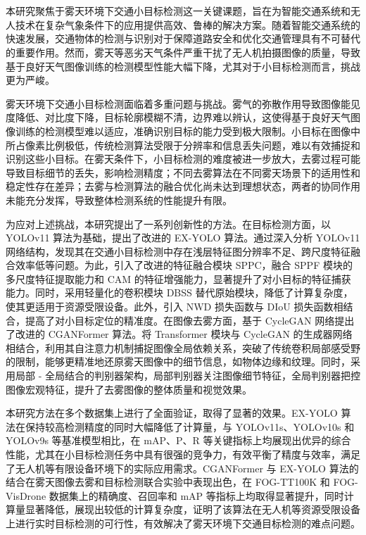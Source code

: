 \section*{\ArticleTitle}
\begin{cnabstract}
\fontsize{14pt}{17.5pt}\selectfont %

本研究聚焦于雾天环境下交通小目标检测这一关键课题，旨在为智能交通系统和无人技术在复杂气象条件下的应用提供高效、鲁棒的解决方案。随着智能交通系统的快速发展，交通物体的检测与识别对于保障道路安全和优化交通管理具有不可替代的重要作用。然而，雾天等恶劣天气条件严重干扰了无人机拍摄图像的质量，导致基于良好天气图像训练的检测模型性能大幅下降，尤其对于小目标检测而言，挑战更为严峻。

雾天环境下交通小目标检测面临着多重问题与挑战。雾气的弥散作用导致图像能见度降低、对比度下降，目标轮廓模糊不清，边界难以辨认，这使得基于良好天气图像训练的检测模型难以适应，准确识别目标的能力受到极大限制。小目标在图像中所占像素比例极低，传统检测算法受限于分辨率和信息丢失问题，难以有效捕捉和识别这些小目标。在雾天条件下，小目标检测的难度被进一步放大，去雾过程可能导致目标细节的丢失，影响检测精度；不同去雾算法在不同雾天场景下的适用性和稳定性存在差异；去雾与检测算法的融合优化尚未达到理想状态，两者的协同作用未能充分发挥，导致整体检测系统的性能提升有限。

为应对上述挑战，本研究提出了一系列创新性的方法。在目标检测方面，以 YOLOv11 算法为基础，提出了改进的 EX-YOLO 算法。通过深入分析 YOLOv11 网络结构，发现其在交通小目标检测中存在浅层特征图分辨率不足、跨尺度特征融合效率低等问题。为此，引入了改进的特征融合模块 SPPC，融合 SPPF 模块的多尺度特征提取能力和 CAM 的特征增强能力，显著提升了对小目标的特征捕获能力。同时，采用轻量化的卷积模块 DBSS 替代原始模块，降低了计算复杂度，使其更适用于资源受限设备。此外，引入 NWD 损失函数与 DIoU 损失函数相结合，提高了对小目标定位的精准度。在图像去雾方面，基于 CycleGAN 网络提出了改进的 CGANFormer 算法。将 Transformer 模块与 CycleGAN 的生成器网络相结合，利用其自注意力机制捕捉图像全局依赖关系，突破了传统卷积局部感受野的限制，能够更精准地还原雾天图像中的细节信息，如物体边缘和纹理。同时，采用局部 - 全局结合的判别器架构，局部判别器关注图像细节特征，全局判别器把控图像宏观特征，提升了去雾图像的整体质量和视觉效果。

本研究方法在多个数据集上进行了全面验证，取得了显著的效果。EX-YOLO 算法在保持较高检测精度的同时大幅降低了计算量，与 YOLOv11s、YOLOv10s 和 YOLOv9s 等基准模型相比，在 mAP、P、R 等关键指标上均展现出优异的综合性能，尤其在小目标检测任务中具有很强的竞争力，有效平衡了精度与效率，满足了无人机等有限设备环境下的实际应用需求。CGANFormer 与 EX-YOLO 算法的结合在雾天图像去雾和目标检测联合实验中表现出色，在 FOG-TT100K 和 FOG-VisDrone 数据集上的精确度、召回率和 mAP 等指标上均取得显著提升，同时计算量显著降低，展现出较低的计算复杂度，证明了该算法在无人机等资源受限设备上进行实时目标检测的可行性，有效解决了雾天环境下交通目标检测的难点问题。


\end{cnabstract}
